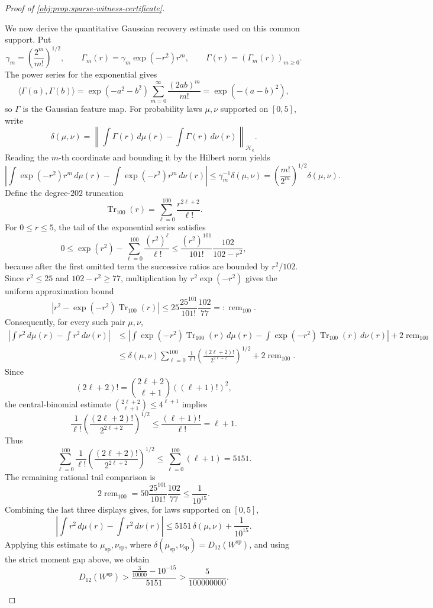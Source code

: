 \begin{proof}[Proof of \cref{obj:prop:sparse-witness-certificate}]
\begin{enumerate}
We now derive the quantitative Gaussian recovery estimate used on this common support.  Put
\[
\gamma_m=\left(\frac{2^m}{m!}\right)^{1/2},
\qquad
\Gamma_m(r)=\gamma_m\exp(-r^2)r^m,
\qquad
\Gamma(r)=(\Gamma_m(r))_{m\ge0}.
\]
The power series for the exponential gives
\[
\langle \Gamma(a),\Gamma(b)\rangle
=
\exp(-a^2-b^2)\sum_{m=0}^\infty \frac{(2ab)^m}{m!}
=
\exp(-(a-b)^2),
\]
so \(\Gamma\) is the Gaussian feature map.  For probability laws \(\mu,\nu\) supported on \([0,5]\), write
\[
\delta(\mu,\nu)=
\left\|\int \Gamma(r)\,d\mu(r)-\int \Gamma(r)\,d\nu(r)\right\|_{\mathcal H_k}.
\]
Reading the \(m\)-th coordinate and bounding it by the Hilbert norm yields
\[
\left|
\int \exp(-r^2)r^m\,d\mu(r)-
\int \exp(-r^2)r^m\,d\nu(r)
\right|
\le
\gamma_m^{-1}\delta(\mu,\nu)
=
\left(\frac{m!}{2^m}\right)^{1/2}\delta(\mu,\nu).
\]
Define the degree-\(202\) truncation
\[
\operatorname{Tr}_{100}(r)=
\sum_{\ell=0}^{100}\frac{r^{2\ell+2}}{\ell!}.
\]
For \(0\le r\le5\), the tail of the exponential series satisfies
\[
0\le
\exp(r^2)-\sum_{\ell=0}^{100}\frac{(r^2)^\ell}{\ell!}
\le
\frac{(r^2)^{101}}{101!}\frac{102}{102-r^2},
\]
because after the first omitted term the successive ratios are bounded by \(r^2/102\).  Since \(r^2\le25\) and \(102-r^2\ge77\), multiplication by \(r^2\exp(-r^2)\) gives the uniform approximation bound
\[
\left|
 r^2-\exp(-r^2)\operatorname{Tr}_{100}(r)
\right|
\le
25\frac{25^{101}}{101!}\frac{102}{77}
=:\operatorname{rem}_{100}.
\]
Consequently, for every such pair \(\mu,\nu\),
\[
\begin{aligned}
\left|
\int r^2\,d\mu(r)-\int r^2\,d\nu(r)
\right|
&\le
\left|
\int \exp(-r^2)\operatorname{Tr}_{100}(r)\,d\mu(r)-
\int \exp(-r^2)\operatorname{Tr}_{100}(r)\,d\nu(r)
\right|
+2\operatorname{rem}_{100}  \\
&\le
\delta(\mu,\nu)
\sum_{\ell=0}^{100}
\frac1{\ell!}
\left(\frac{(2\ell+2)!}{2^{2\ell+2}}\right)^{1/2}
+2\operatorname{rem}_{100}.
\end{aligned}
\]
Since
\[
(2\ell+2)!=\binom{2\ell+2}{\ell+1}((\ell+1)!)^2,
\]
the central-binomial estimate \(\binom{2\ell+2}{\ell+1}\le 4^{\ell+1}\) implies
\[
\frac1{\ell!}
\left(\frac{(2\ell+2)!}{2^{2\ell+2}}\right)^{1/2}
\le
\frac{(\ell+1)!}{\ell!}
=
\ell+1.
\]
Thus
\[
\sum_{\ell=0}^{100}
\frac1{\ell!}
\left(\frac{(2\ell+2)!}{2^{2\ell+2}}\right)^{1/2}
\le
\sum_{\ell=0}^{100}(\ell+1)=5151.
\]
The remaining rational tail comparison is
\[
2\operatorname{rem}_{100}
=
50\frac{25^{101}}{101!}\frac{102}{77}
\le
\frac1{10^{15}}.
\]
Combining the last three displays gives, for laws supported on \([0,5]\),
\[
\left|
\int r^2\,d\mu(r)-\int r^2\,d\nu(r)
\right|
\le
5151\,\delta(\mu,\nu)+\frac1{10^{15}}.
\]
Applying this estimate to \(\mu_{\mathrm{sp}},\nu_{\mathrm{sp}}\), where \(\delta(\mu_{\mathrm{sp}},\nu_{\mathrm{sp}})=D_{12}(W^{\mathrm{sp}})\), and using the strict moment gap above, we obtain
\[
D_{12}(W^{\mathrm{sp}})
>
\frac{\frac3{10000}-10^{-15}}{5151}
>
\frac5{100000000}.
\]


\end{enumerate}
\end{proof}

